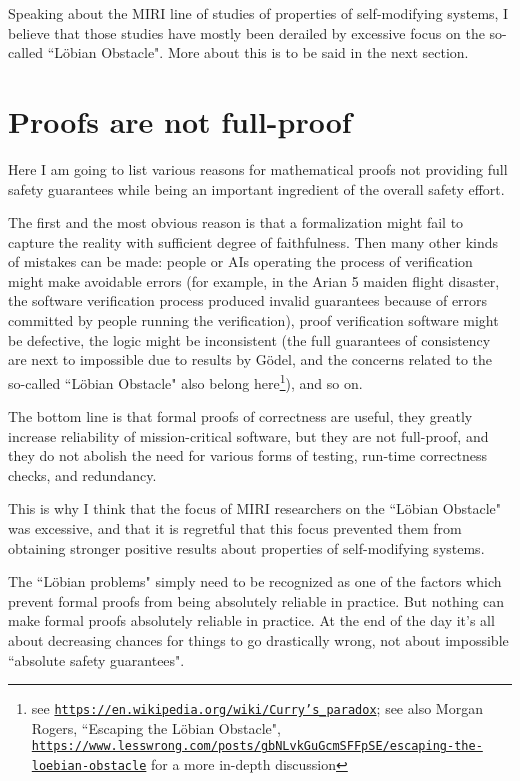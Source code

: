 \documentclass{article}
\begin{document}
Speaking about the MIRI line of studies of properties of self-modifying systems, I believe that those studies have
mostly been derailed by excessive focus on the so-called ``Löbian Obstacle". More about this is to be said in the next section.

\section{Proofs are not full-proof}\label{sec:proof}

Here I am going to list various reasons for mathematical proofs not providing full safety guarantees
while being an important ingredient of the overall safety effort.

The first and the most obvious reason is that a formalization might fail to capture the reality with sufficient degree
of faithfulness. Then many other kinds of mistakes can be made: people or AIs operating the process of verification might make avoidable
errors (for example, in the Arian 5 maiden flight disaster, the software verification process produced invalid guarantees because of
errors committed by people running the verification), proof verification software might be defective,
the logic might be inconsistent (the full guarantees of  consistency are next to impossible due to results by Gödel, 
and the concerns related to the so-called ``Löbian Obstacle" also belong here\footnote{see
\href{https://en.wikipedia.org/wiki/Curry\%27s\_paradox}{\tt https://en.wikipedia.org/wiki/Curry's\_paradox};
see also Morgan Rogers, ``Escaping the Löbian Obstacle",\\ 
\href{https://www.lesswrong.com/posts/gbNLvkGuGcmSFFpSE/escaping-the-loebian-obstacle}
{\tt https://www.lesswrong.com/posts/gbNLvkGuGcmSFFpSE/escaping-the-loebian-obstacle} for a more in-depth
discussion}), and so on.

The bottom line is that formal proofs of correctness are useful, they greatly increase reliability of mission-critical
software, but they are not full-proof, and they do not abolish the need for various forms of testing, 
run-time correctness checks, and redundancy.

This is why I think that the focus of MIRI researchers on the ``Löbian Obstacle" was excessive, and that it is regretful
that this focus prevented them from obtaining stronger positive results about properties of self-modifying systems.

The ``Löbian problems" simply need to be recognized as one of the factors which prevent formal proofs from being
absolutely reliable in practice. But nothing can make formal proofs absolutely reliable in practice. At the end of the day
it's all about decreasing chances for things to go drastically wrong, not about impossible ``absolute safety guarantees".
\end{document}

